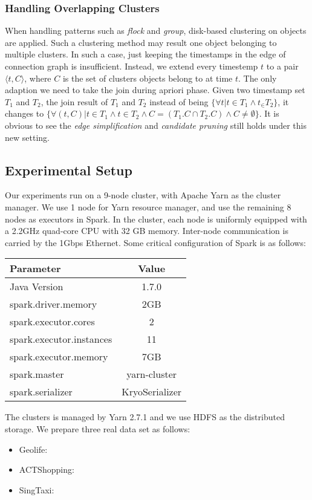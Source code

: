 \subsubsection{Handling Overlapping Clusters}
When handling patterns such as \emph{flock} and \emph{group}, disk-based clustering
on objects are applied. Such a clustering method may result one object belonging to
multiple clusters. In such a case, just keeping the timestamps in the edge
of connection graph is insufficient. Instead, we extend every timestemp $t$
to a pair $\langle t,C \rangle$, where $C$ is the set of clusters objects
belong to at time $t$. The only adaption we need to take the join during
apriori phase. Given two timestamp set $T_1$ and $T_2$, the join result of
$T_1$ and $T_2$ instead of being $\{\forall t | t\in T_1 \wedge t_\in T_2\}$,
it changes to $\{\forall (t,C) | t\in T_1 \wedge t \in T_2 \wedge C = (T_1.C \cap T_2.C) \wedge C \neq \emptyset\}$.
It is obvious to see the \emph{edge simplification} and \emph{candidate pruning} 
still holds under this new setting.


\subsection{Experimental Setup}
Our experiments run on a 9-node cluster, with Apache Yarn as
the cluster manager. We use 1 node for Yarn resource manager, 
and use the remaining 8 nodes as executors in Spark. In the 
cluster, each node is uniformly equipped with a 2.2GHz quad-core CPU
with 32 GB memory. Inter-node communication is carried by 
the 1Gbps Ethernet.  Some critical configuration of Spark is 
as follows:
\begin{table} [h]
\centering
\begin{tabular}{|l|c|}
\hline 
Parameter & Value  \\ 
\hline 
Java Version & 1.7.0 \\ 
\hline 
spark.driver.memory & 2GB \\ 
\hline 
spark.executor.cores & 2  \\ 
\hline 
spark.executor.instances & 11 \\ 
\hline 
spark.executor.memory & 7GB \\ 
\hline 
spark.master & yarn-cluster \\
\hline 
spark.serializer & KryoSerializer \\ 
\hline 
\end{tabular} 
\end{table}

The clusters is managed by Yarn 2.7.1 and we use HDFS
as the distributed storage. We prepare three real data
set as follows:
\begin{itemize}
\item{Geolife}:
\item{ACTShopping}:
\item{SingTaxi}:
\end{itemize}







